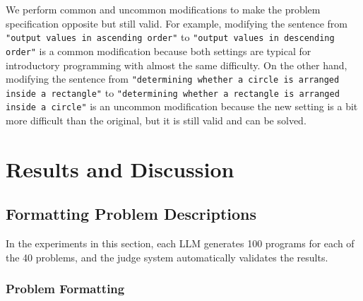 \documentclass{article}
\begin{document}
We perform common and uncommon modifications to make the problem specification opposite but still valid.
For example, modifying the sentence from \texttt{"output values in ascending order"} to \texttt{"output values in descending order"} is a common modification because both settings are typical for introductory programming with almost the same difficulty.
On the other hand, modifying the sentence from \texttt{"determining whether a circle is arranged inside a rectangle"} to \texttt{"determining whether a rectangle is arranged inside a circle"} is an uncommon modification because the new setting is a bit more difficult than the original, but it is still valid and can be solved.












\section{Results and Discussion}
\label{sec:results}





\subsection{Formatting Problem Descriptions}
\label{sec:results:formatting}

In the experiments in this section, each LLM generates 100 programs for each of the 40 problems, and the judge system automatically validates the results.





\subsubsection{Problem Formatting}
\label{sec:results:formatting:problem}
\end{document}
